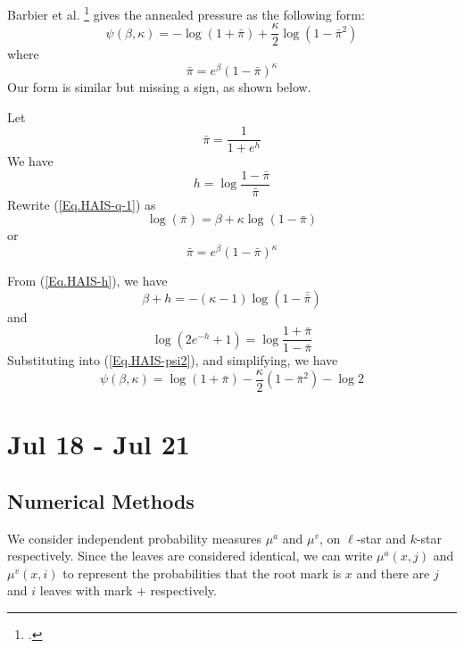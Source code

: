 \documentclass[12pt]{article}
\numberwithin{equation}{section}
\begin{document}
Barbier et al. \footcite{barbier_hard-core_2013} gives the annealed pressure as the following form:
\begin{equation}
    \psi(\beta, \kappa) = -\log(1+\bar{\pi})+\frac\kappa2\log(1-\bar{\pi}^2)
\end{equation}
where
\begin{equation*}
    \bar{\pi} = e^\beta (1-\bar{\pi})^\kappa
\end{equation*}
Our form is similar but missing a sign, as shown below.

Let
\begin{equation}
    \bar{\pi} = \frac{1}{1+e^h}
\end{equation}
We have
\begin{equation*}
    h = \log\frac{1-\bar{\pi}}{\bar{\pi}}
\end{equation*}
Rewrite (\ref{Eq.HAIS-q-1}) as
\begin{equation}
    \log(\bar{\pi}) = \beta + \kappa \log(1 - \bar{\pi})
\end{equation}
or
\begin{equation}
    \bar{\pi} = e^\beta(1 - \bar{\pi})^\kappa
\end{equation}

From (\ref{Eq.HAIS-h}), we have
\begin{equation*}
    \beta + h = -(\kappa-1)\log(1-\bar{\bar{\pi}})
\end{equation*}
and
\begin{equation*}
    \log(2e^{-h}+1) = \log\frac{1+\bar{\pi}}{1-\bar{\pi}}
\end{equation*}
Substituting into (\ref{Eq.HAIS-psi2}), and simplifying, we have
\begin{equation}
    \psi(\beta, \kappa) = \log(1+\bar{\pi}) - \frac\kappa2\left(1-\bar{\pi}^2\right) - \log 2
\end{equation}

\newpage

\section{Jul 18 - Jul 21}

\subsection{Numerical Methods}
We consider independent probability measures $\mu^a$ and $\mu^v$, on $\ell$-star and $k$-star respectively.
Since the leaves are considered identical, we can write $\mu^a(x, j)$ and $\mu^v(x, i)$ to represent the probabilities
that the root mark is $x$ and there are $j$ and $i$ leaves with mark $+$ respectively.
\end{document}
